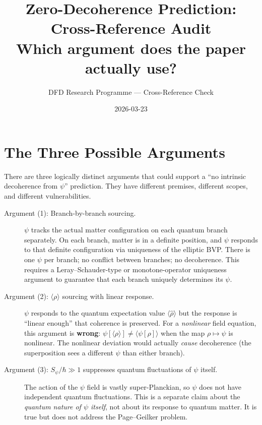 \documentclass[11pt,a4paper]{article}
\title{Zero-Decoherence Prediction: Cross-Reference Audit\\
\large Which argument does the paper actually use?}
\author{DFD Research Programme --- Cross-Reference Check}
\date{2026-03-23}
\begin{document}
\maketitle

\section{The Three Possible Arguments}

There are three logically distinct arguments that could support a
``no intrinsic decoherence from $\psi$'' prediction. They have different
premises, different scopes, and different vulnerabilities.

\begin{description}
\item[Argument (1): Branch-by-branch sourcing.]
$\psi$ tracks the actual matter configuration on each quantum branch
separately. On each branch, matter is in a definite position, and
$\psi$ responds to that definite configuration via uniqueness of
the elliptic BVP. There is one $\psi$ per branch; no conflict between
branches; no decoherence. This requires a Leray--Schauder-type or
monotone-operator uniqueness argument to guarantee that each branch
uniquely determines its $\psi$.

\item[Argument (2): $\langle\rho\rangle$ sourcing with linear response.]
$\psi$ responds to the quantum expectation value $\langle\hat\rho\rangle$
but the response is ``linear enough'' that coherence is preserved.
For a \emph{nonlinear} field equation, this argument is \textbf{wrong}:
$\psi[\langle\rho\rangle] \neq \langle\psi[\rho]\rangle$ when the
map $\rho \mapsto \psi$ is nonlinear. The nonlinear deviation would
actually \emph{cause} decoherence (the superposition sees a different
$\psi$ than either branch).

\item[Argument (3): $S_\psi/\hbar \gg 1$ suppresses quantum fluctuations
of $\psi$ itself.]
The action of the $\psi$ field is vastly super-Planckian, so $\psi$
does not have independent quantum fluctuations. This is a separate
claim about the \emph{quantum nature of $\psi$ itself}, not about
its response to quantum matter. It is true but does not address the
Page--Geilker problem.
\end{description}

\end{document}
